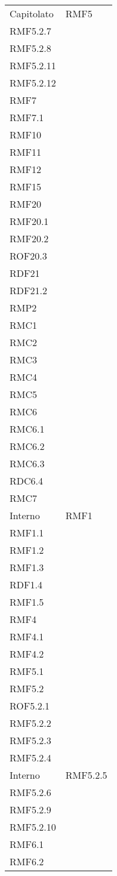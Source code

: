 \begin{longtable}[h!] { >{\centering}m{5cm} >{\centering}m{5cm} }
	Capitolato & RMF5 \\
	 RMF5.2.7 \\
	 RMF5.2.8 \\
	 RMF5.2.11 \\
	 RMF5.2.12 \\
	 RMF7 \\
	 RMF7.1 \\
	 RMF10 \\
	 RMF11 \\
	 RMF12 \\
	 RMF15 \\
	 RMF20 \\
	 RMF20.1 \\
	 RMF20.2 \\
	 ROF20.3 \\
	 RDF21 \\
	 RDF21.2 \\
	 RMP2 \\
	 RMC1 \\
	 RMC2 \\
	 RMC3 \\
	 RMC4 \\
	 RMC5 \\
	 RMC6 \\
	 RMC6.1 \\
	 RMC6.2 \\
	 RMC6.3 \\
	 RDC6.4 \\
	 RMC7
	 \tabularnewline
	 Interno & RMF1 \\
	 RMF1.1 \\
	 RMF1.2 \\
	 RMF1.3 \\
	 RDF1.4 \\
	 RMF1.5 \\
	 RMF4 \\
	 RMF4.1 \\
	 RMF4.2 \\
	 RMF5.1 \\
	 RMF5.2 \\
	 ROF5.2.1 \\
	 RMF5.2.2 \\
	 RMF5.2.3 \\
	 RMF5.2.4 
	 \tabularnewline
	 Interno & RMF5.2.5 \\ 
	 RMF5.2.6 \\
	 RMF5.2.9 \\
	 RMF5.2.10 \\
	 RMF6.1 \\
	 RMF6.2 \\

\end{longtable}
